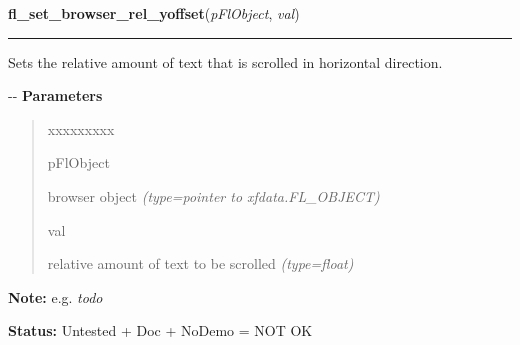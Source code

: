 \hspace{.8\funcindent}\begin{boxedminipage}{\funcwidth}

    \raggedright \textbf{fl\_set\_browser\_rel\_yoffset}(\textit{pFlObject}, \textit{val})

    \vspace{-1.5ex}

    \rule{\textwidth}{0.5\fboxrule}
\setlength{\parskip}{2ex}

Sets the relative amount of text that is scrolled in horizontal
direction.

-{}-
\setlength{\parskip}{1ex}
      \textbf{Parameters}
      \vspace{-1ex}

      \begin{quote}
        \begin{Ventry}{xxxxxxxxx}

          \item[pFlObject]


browser object
            {\it (type=pointer to xfdata.FL\_OBJECT)}

          \item[val]


relative amount of text to be scrolled
            {\it (type=float)}

        \end{Ventry}

      \end{quote}

\textbf{Note:} 
e.g. \emph{todo}


\textbf{Status:} 
Untested + Doc + NoDemo = NOT OK


    \end{boxedminipage}

    \label{xformslib:flbrowser:fl_set_browser_scrollbarsize}

    \vspace{0.5ex}

